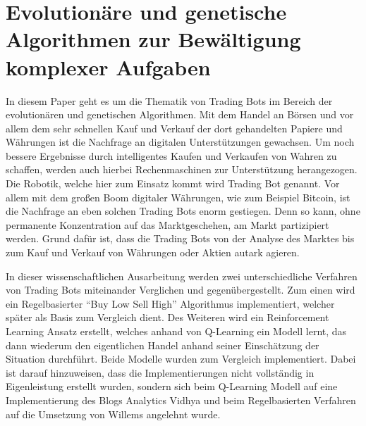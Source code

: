 \chapter{Evolutionäre und genetische Algorithmen zur Bewältigung komplexer Aufgaben}

In diesem Paper geht es um die Thematik von Trading Bots im Bereich der evolutionären und genetischen Algorithmen. 
Mit dem Handel an Börsen und vor allem dem sehr schnellen Kauf und Verkauf der dort gehandelten Papiere und Währungen ist die Nachfrage an digitalen Unterstützungen gewachsen. \cite{admirals_2018} Um noch bessere Ergebnisse durch intelligentes Kaufen und Verkaufen von Wahren zu schaffen, werden auch hierbei Rechenmaschinen zur Unterstützung herangezogen. Die Robotik, welche hier zum Einsatz kommt wird Trading Bot genannt. \cite{scheuschner_2021} Vor allem mit dem großen Boom digitaler Währungen, wie zum Beispiel Bitcoin, ist die Nachfrage an eben solchen Trading Bots enorm gestiegen. \cite{scheuschner_2021} Denn so kann, ohne permanente Konzentration auf das Marktgeschehen, am Markt partizipiert werden. Grund dafür ist, dass die Trading Bots von der Analyse des Marktes bis zum Kauf und Verkauf von Währungen oder Aktien autark agieren.

In dieser wissenschaftlichen Ausarbeitung werden zwei unterschiedliche Verfahren von Trading Bots miteinander Verglichen und gegenübergestellt. Zum einen wird ein Regelbasierter \enquote{Buy Low Sell High} Algorithmus implementiert, welcher später als Basis zum Vergleich dient. Des Weiteren wird ein Reinforcement Learning Ansatz erstellt, welches anhand von Q-Learning ein Modell lernt, das dann wiederum den eigentlichen Handel anhand seiner Einschätzung der Situation durchführt. Beide Modelle wurden zum Vergleich implementiert. Dabei ist darauf hinzuweisen, dass die Implementierungen nicht vollständig in Eigenleistung erstellt wurden, sondern sich beim Q-Learning Modell auf eine Implementierung des Blogs Analytics Vidhya \cite{analyticsvidhya_2021} und beim Regelbasierten Verfahren auf die Umsetzung von Willems \cite{willems_2019} angelehnt wurde.

